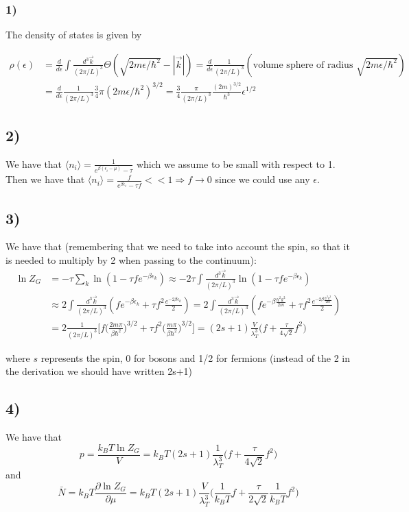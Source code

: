 \documentclass[10pt,a4paper]{book}
\newcommand{\p}{\partial}
\begin{document}
\subsubsection*{1)}
The density of states is given by

\begin{align*}
\rho(\epsilon)&=\frac{d}{d\epsilon}\int \frac{d^3\vec{k}}{(2\pi/L)^3}\Theta(\sqrt{2m\epsilon/\hbar^2}-|\vec{k}|)=\frac{d}{d\epsilon}\frac{1}{(2\pi/L)^3}(\text{volume sphere of radius }\sqrt{2m\epsilon/\hbar^2})\\
&=\frac{d}{d\epsilon}\frac{1}{(2\pi /L)^3}\frac{3}{4}\pi(2m\epsilon/\hbar^2)^{3/2}=\frac{3}{4}\frac{\pi}{(2\pi/L)^3}\frac{(2m)^{3/2}}{\hbar^3}\epsilon^{1/2}
\end{align*}


\subsection*{2)}
We have that $\langle n_i\rangle =\frac{1}{e^{\beta(\epsilon_i-\mu)}-\tau}$ which we assume to be small with respect to 1. Then we have that $\langle n_i\rangle =\frac{f}{e^{\beta\epsilon_i}-\tau f}<<1\Rightarrow f\to 0$ since we could use any $\epsilon$. 

\subsection*{3)}
We have that (remembering that we need to take into account the spin, so that it is needed to multiply by 2 when passing to the continuum):
\begin{align*}
\ln Z_G&=-\tau\sum_k\ln(1-\tau f e^{-\beta\epsilon_k})\approx -2\tau\int \frac{d^3\vec{k}}{(2\pi/L)^3}\ln(1-\tau fe^{-\beta\epsilon_k})\\
&\approx 2\int\frac{d^3\vec{k}}{(2\pi/L)^3}(fe^{-\beta\epsilon_k}+\tau f^2\frac{e^{-2\beta\epsilon_k}}{2})=2\int\frac{d^3\vec{k}}{(2\pi/L)^3}(fe^{-\beta\frac{\hbar^2 k^2}{2m}}+\tau f^2\frac{e^{-2\beta\frac{\hbar^2 k^2}{2m}}}{2})\\
&=2\frac{1}{(2\pi/L)^3}\bigg[f\bigg(\frac{2m\pi}{\beta\hbar^2}\bigg)^{3/2}+\tau f^2\bigg(\frac{m\pi}{\beta\hbar^2}\bigg)^{3/2}\bigg]=(2s+1)\frac{V}{\lambda_T^3}\bigg(f+\frac{\tau}{4\sqrt{2}}f^2\bigg)
\end{align*}

where $s$ represents the spin, 0 for bosons and 1/2 for fermions (instead of the 2 in the derivation we should have written 2s+1)

\subsection*{4)}
We have that 
$$p=\frac{k_BT\ln Z_G}{V}=k_BT(2s+1)\frac{1}{\lambda_T^3}\bigg(f+\frac{\tau}{4\sqrt{2}}f^2\bigg)$$
and 
$$\bar{N}=k_BT\frac{\p\ln Z_G}{\p\mu}=k_BT(2s+1)\frac{V}{\lambda_T^3}\bigg(\frac{1}{k_BT}f+\frac{\tau}{2\sqrt{2}}\frac{1}{k_BT}f^2\bigg)$$
\end{document}
